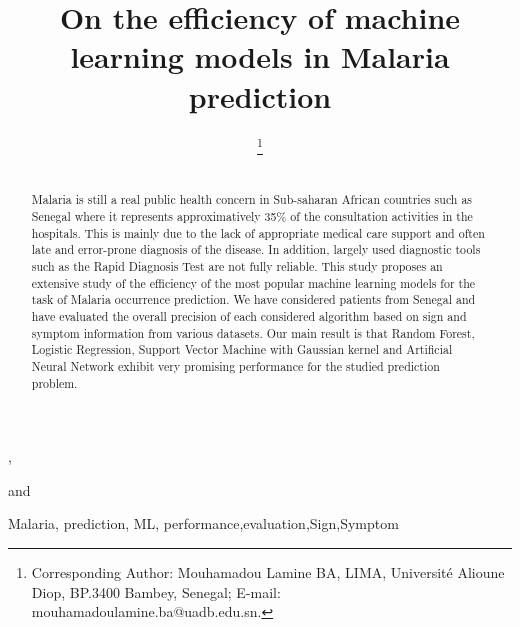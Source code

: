\documentclass{IOS-Book-Article}
\def\hb{\hbox to 10.7 cm{}}
\def\hb{\hbox to 10.7 cm{}}
\begin{document}
\pagestyle{headings}
\def\thepage{}

\begin{frontmatter}              %

\title{On the efficiency of machine learning models in Malaria prediction}

\markboth{}{January 2021\hb}

\author{ },
\author{ 
\thanks{Corresponding Author: Mouhamadou Lamine BA, LIMA, Universit\'e Alioune Diop,
BP.3400 Bambey, Senegal; E-mail: mouhamadoulamine.ba@uadb.edu.sn.}}
and
\author{ }

\address{LIMA, Universit\'e Alioune Diop, Bambey, Senegal}

\begin{abstract}\\
Malaria is still a real public health concern in Sub-saharan African countries such as Senegal where it represents approximatively 35\% of the consultation activities in the hospitals. This is mainly due to the lack of appropriate medical care support and often late and error-prone diagnosis of the disease. In addition, largely used diagnostic tools such as the Rapid Diagnosis Test are not fully reliable. This study proposes an extensive study of the efficiency of the most popular  machine learning models for the task of Malaria occurrence prediction. We have considered patients from Senegal and have evaluated the overall precision of each considered algorithm based on sign and symptom information from various datasets. Our main result is that Random Forest, Logistic Regression, Support Vector Machine with Gaussian kernel and Artificial Neural Network exhibit very promising performance for the studied prediction problem.
\end{abstract}

\begin{keyword}
Malaria, prediction, ML, 
performance\sep evaluation\sep Sign\sep Symptom
\end{keyword}
\end{frontmatter}
\scriptsize


\end{document}
